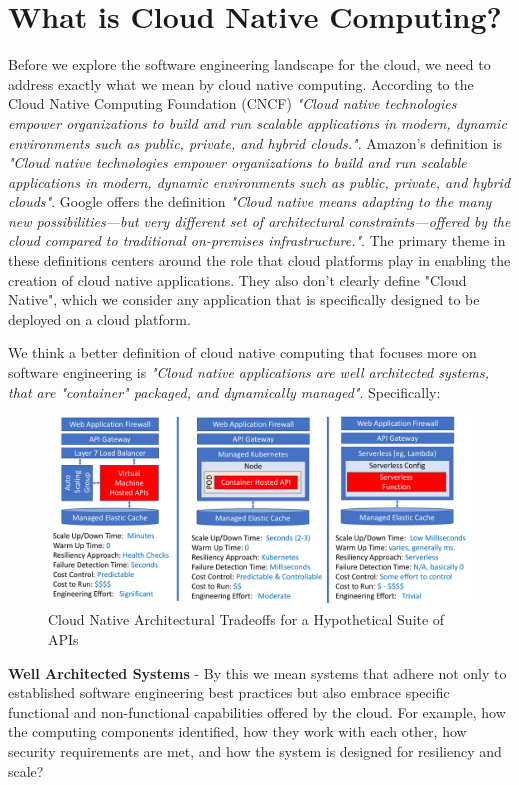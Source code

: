 \documentclass[conference]{IEEEconf}
\begin{document}
\section{What is Cloud Native Computing?}
\label{sec:WhatIsCNF}
Before we explore the software engineering landscape for the cloud, we need to address exactly what we mean by cloud native computing.  According to the Cloud Native Computing Foundation (CNCF)\cite{CNCFHome}  \textit{"Cloud native technologies empower organizations to build and run scalable applications in modern, dynamic environments such as public, private, and hybrid clouds."}.  Amazon's definition is \textit{"Cloud native technologies empower organizations to build and run scalable applications in modern, dynamic environments such as public, private, and hybrid clouds"}. Google offers the definition \textit{"Cloud native means adapting to the many new possibilities—but very different set of architectural constraints—offered by the cloud compared to traditional on-premises infrastructure."}.  The primary theme in these definitions centers around the role that cloud platforms play in enabling the creation of cloud native applications.  They also don't clearly define "Cloud Native", which we consider any application that is specifically designed to be deployed on a cloud platform. 

We think a better definition of cloud native computing that focuses more on  software engineering is \textit{"Cloud native applications are well architected systems, that are "container" packaged, and dynamically managed"}. Specifically:

\begin{figure}[t]
	\includegraphics[width=\textwidth]{images/APIPackageTradoffs}	
	\caption{Cloud Native Architectural Tradeoffs for a Hypothetical Suite of APIs}
	\label{fig:CloudQATradeoffs}
\end{figure}

\textbf{Well Architected Systems} - By this we mean systems that adhere not only to established software engineering best practices but also embrace specific functional and non-functional capabilities offered by the cloud. For example, how the computing components identified, how they work with each other, how security requirements are met, and how the system is designed for resiliency and scale?
\end{document}
